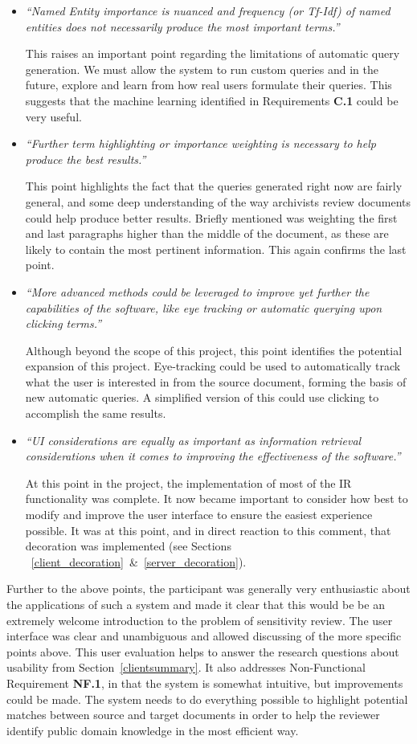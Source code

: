 \documentclass{l4proj}
\begin{document}
\begin{itemize}
\item \textit{``Named Entity importance is nuanced and frequency (or Tf-Idf) of named entities does not necessarily produce the most important terms.''}
\par
This raises an important point regarding the limitations of automatic query generation. We must allow the system to run custom queries and in the future, explore and learn from how real users formulate their queries. This suggests that the machine learning identified in Requirements \textbf{C.1} could be very useful.
\item \textit{``Further term highlighting or importance weighting is necessary to help produce the best results.''}
\par
This point highlights the fact that the queries generated right now are fairly general, and some deep understanding of the way archivists review documents could help produce better results. Briefly mentioned was weighting the first and last paragraphs higher than the middle of the document, as these are likely to contain the most pertinent information. This again confirms the last point.
\item \textit{``More advanced methods could be leveraged to improve yet further the capabilities of the software, like eye tracking or automatic querying upon clicking terms.''}
\par
Although beyond the scope of this project, this point identifies the potential expansion of this project. Eye-tracking could be used to automatically track what the user is interested in from the source document, forming the basis of new automatic queries. A simplified version of this could use clicking to accomplish the same results.
\item \textit{``UI considerations are equally as important as information retrieval considerations when it comes to improving the effectiveness of the software.''}
\par
At this point in the project, the implementation of most of the IR functionality was complete. It now became important to consider how best to modify and improve the user interface to ensure the easiest experience possible. It was at this point, and in direct reaction to this comment, that decoration was implemented (see Sections ~\ref{client_decoration}~\&~\ref{server_decoration}).
\end{itemize}
Further to the above points, the participant was generally very enthusiastic about the applications of such a system and made it clear that this would be be an extremely welcome introduction to the problem of sensitivity review. The user interface was clear and unambiguous and allowed discussing of the more specific points above.
This user evaluation helps to answer the research questions about usability from Section~\ref{clientsummary}. It also addresses Non-Functional Requirement \textbf{NF.1}, in that the system is somewhat intuitive, but improvements could be made.
The system needs to do everything possible to highlight potential matches between source and target documents in order to help the reviewer identify public domain knowledge in the most efficient way.
\end{document}
